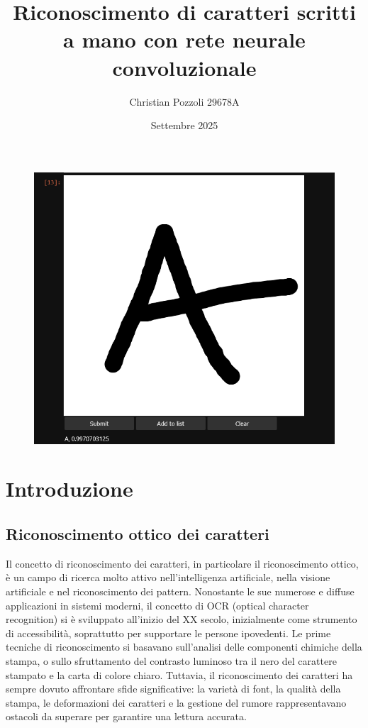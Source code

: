 \documentclass[a4paper,12pt]{article}
\title{Riconoscimento di caratteri scritti a mano con rete neurale convoluzionale}
\author{Christian Pozzoli 29678A}
\date{Settembre 2025}
\begin{document}
\maketitle
\begin{figure}[H]
    \centering
    \includegraphics[width=0.8\linewidth]{images/canvas.png}
\end{figure}
\newpage
\renewcommand*\contentsname{Indice}
\tableofcontents
\newpage

\section{Introduzione}
\subsection{Riconoscimento ottico dei caratteri}
Il concetto di riconoscimento dei caratteri, in particolare il riconoscimento ottico, è un campo di ricerca molto attivo nell'intelligenza artificiale, nella visione artificiale e nel riconoscimento dei pattern. Nonostante le sue numerose e diffuse applicazioni in sistemi moderni, il concetto di OCR (optical character recognition) si è sviluppato all'inizio del XX secolo, inizialmente come strumento di accessibilità, soprattutto per supportare le persone ipovedenti. Le prime tecniche di riconoscimento si basavano sull'analisi delle componenti chimiche della stampa, o sullo sfruttamento del contrasto luminoso tra il nero del carattere stampato e la carta di colore chiaro. Tuttavia, il riconoscimento dei caratteri ha sempre dovuto affrontare sfide significative: la varietà di font, la qualità della stampa, le deformazioni dei caratteri e la gestione del rumore rappresentavano ostacoli da superare per garantire una lettura accurata.
\end{document}
